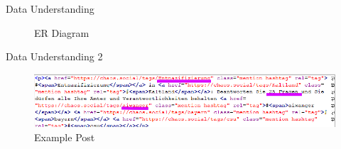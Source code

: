 \begin{frame}{Data Understanding}
	
	\begin{figure}[htbp]
		\centering
		\resizebox{\columnwidth}{!}{}
		\caption{ER Diagram}
	\end{figure}
	
\end{frame}

\begin{frame}{Data Understanding 2}
	\begin{figure}[htbp]
		\centering
		\includegraphics[width=\linewidth]{pictures/example_posts.png}
		\caption{Example Post}
	\end{figure}
\end{frame}


